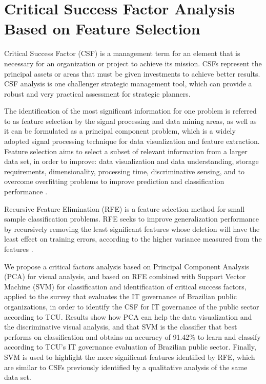 \chapter{Critical Success Factor Analysis Based on Feature Selection}
\label{apx:b_csf_fs}


Critical Success Factor (CSF) is a management term for an element that is necessary for an organization or project to achieve its mission. CSFs represent the principal assets or areas that must be given investments to achieve better results. CSF analysis is one challenger strategic management tool, which can provide a robust and very practical assessment for strategic planners.

The identification of the most significant information for one problem is referred to as feature selection by the signal processing and data mining areas, as well as it can be formulated as a principal component problem, which is a widely adopted signal processing technique for data visualization and feature extraction. Feature selection aims to select a subset of relevant information from a larger data set, in order to improve: data visualization and data understanding, storage requirements, dimensionality, processing time, discriminative sensing, and to overcome overfitting problems to improve prediction and classification performance \cite{chandrashekar2014survey}.

Recursive Feature Elimination (RFE) is a feature selection method for small sample classification problems. RFE seeks to improve generalization performance by recursively removing the least significant features whose deletion will have the least effect on training errors, according to the higher variance measured from the features \cite{chen2007enhanced}.

We propose a critical factors analysis based on Principal Component Analysis (PCA) for visual analysis, and based on RFE combined with Support Vector Machine (SVM) \cite{hearst1998support} for classification and identification of critical success factors, applied to the survey that evaluates the IT governance of Brazilian public organizations, in order to identify the CSF for IT governance of the public sector according to TCU. Results show how PCA can help the data visualization and the discriminative visual analysis, and that SVM is the classifier that best performs on classification and obtains an accuracy of 91.42\% to learn and classify according to TCU's IT governance evaluation of Brazilian public sector. Finally, SVM is used to highlight the more significant features identified by RFE, which are similar to CSFs previously identified by a qualitative analysis of the same data set.


